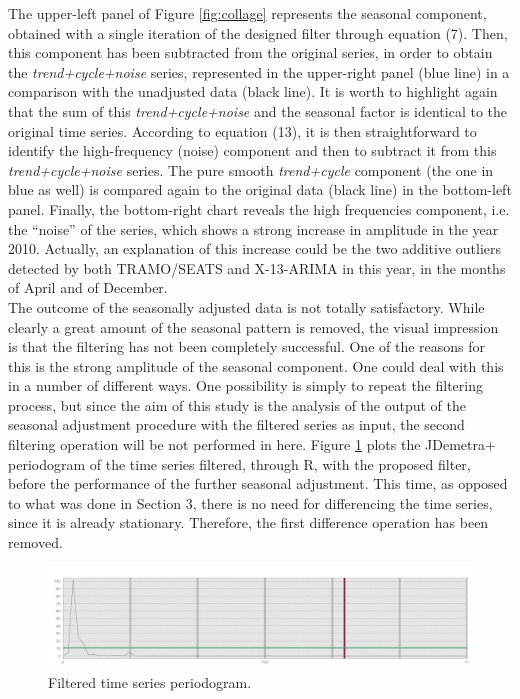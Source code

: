 \documentclass[english,blauw]{cbsdiscussionpaper}
\begin{document}
The upper-left panel of Figure \ref{fig:collage} represents the seasonal component, obtained with a single iteration of the designed filter through equation (7). Then, this component has been subtracted from the original series, in order to obtain the \textit{trend+cycle+noise} series, represented in the upper-right panel (blue line) in a comparison with the unadjusted data (black line). It is worth to highlight again that the sum of this \textit{trend+cycle+noise} and the seasonal factor is identical to the original time series. According to equation (13), it is then straightforward to identify the high-frequency (noise) component and then to subtract it from this \textit{trend+cycle+noise} series. The pure smooth \textit{trend+cycle} component (the one in blue as well) is compared again to the original data (black line) in the bottom-left panel. Finally, the bottom-right chart reveals the high frequencies component, i.e. the ``noise'' of the series, which shows a strong increase in amplitude in the year 2010. Actually, an explanation of this increase could be the two additive outliers detected by both TRAMO/SEATS and X-13-ARIMA in this year, in the months of April and of December.\\The outcome of the seasonally adjusted data is not totally satisfactory. While clearly a great amount of the seasonal pattern is removed, the visual impression is that the filtering has not been completely successful. One of the reasons for this is the strong amplitude of the seasonal component. One could deal with this in a number of different ways. One possibility is simply to repeat the filtering process, but since the aim of this study is the analysis of the output of the seasonal adjustment procedure with the filtered series as input, the second filtering operation will be not performed in here. Figure \ref{fig:tc_periodogram} plots the JDemetra+ periodogram of the time series filtered, through R, with the proposed filter, before the performance of the further seasonal adjustment. This time, as opposed to what was done in Section 3, there is no need for differencing the time series, since it is already stationary. Therefore, the first difference operation has been removed.
\begin{figure}[h]
\includegraphics[width=\linewidth]{../images/capitolo4/tc_periodogram.jpg}
\caption{Filtered time series periodogram.}
\label{fig:tc_periodogram}
\end{figure}
\end{document}
